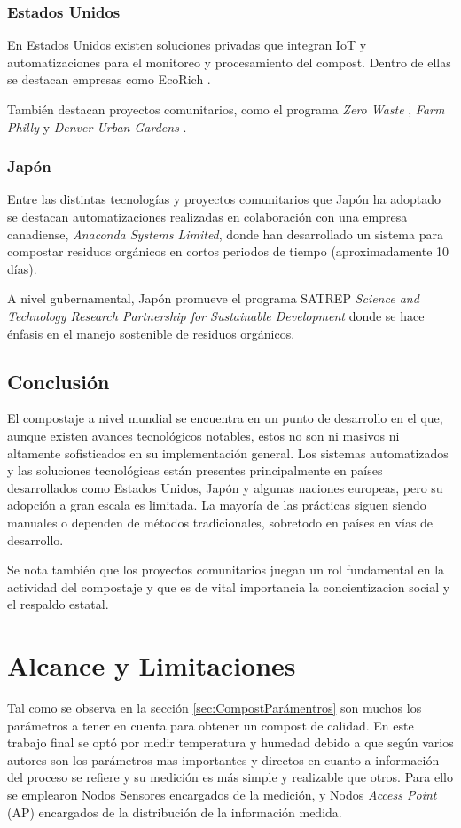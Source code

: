 \subsubsection{Estados Unidos}
En Estados Unidos existen soluciones privadas que integran IoT y automatizaciones para el monitoreo y procesamiento del compost. Dentro de ellas se destacan empresas como EcoRich \citep{ECORICH}.

También destacan proyectos comunitarios, como el programa \textit{Zero Waste} \citep{ZeroWaste}, \textit{Farm Philly} \citep{FarmPhilly} y \textit{Denver Urban Gardens} \citep{DenverUrban}.

\subsubsection{Japón}
Entre las distintas tecnologías y proyectos comunitarios que Japón ha adoptado se destacan automatizaciones realizadas en colaboración con una empresa canadiense, \textit{Anaconda Systems Limited}\citep{AnacondaSystemsWebsite}, donde han desarrollado un sistema para compostar residuos orgánicos en cortos periodos de tiempo (aproximadamente 10 días).

A nivel gubernamental, Japón promueve el programa SATREP \textit{Science and Technology Research Partnership for Sustainable Development} \citep{JSTWebsite} donde se hace énfasis en el manejo sostenible de residuos orgánicos.

\subsection{Conclusión}
El compostaje a nivel mundial se encuentra en un punto de desarrollo en el que, aunque existen avances tecnológicos notables, estos no son ni masivos ni altamente sofisticados en su implementación general. Los sistemas automatizados y las soluciones tecnológicas están presentes principalmente en países desarrollados como Estados Unidos, Japón y algunas naciones europeas, pero su adopción a gran escala es limitada. La mayoría de las prácticas siguen siendo manuales o dependen de métodos tradicionales, sobretodo en países en vías de desarrollo.

Se nota también que los proyectos comunitarios juegan un rol fundamental en la actividad del compostaje y que es de vital importancia la concientizacion social y el respaldo estatal.


\section{Alcance y Limitaciones}
Tal como se observa en la sección \ref{sec:CompostParámentros} son muchos los parámetros a tener en cuenta para obtener un compost de calidad. En este trabajo final se optó por medir temperatura y humedad debido a que según varios autores \citep{Risti} \citep{FactoresCompost} \citep{ManualBuenasPracticas} son los parámetros mas importantes y directos en cuanto a información del proceso se refiere y su medición es más simple y realizable que otros. Para ello se emplearon Nodos Sensores encargados de la medición, y Nodos \textit{Access Point} (AP) encargados de la distribución de la información medida.

